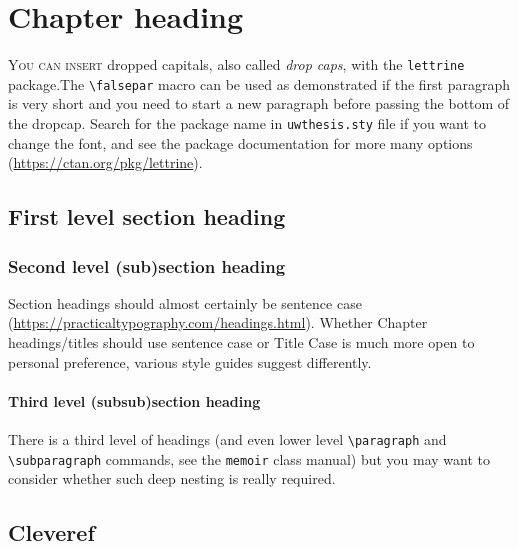 \chapter{Chapter heading}
\label{chap:one}

\lettrine{Y}{ou can insert}
dropped capitals, also called \emph{drop caps}, with the \texttt{lettrine} package.\falsepar The \verb|\falsepar| macro can be used as demonstrated if the first paragraph is very short and you need to start a new paragraph before passing the bottom of the dropcap. Search for the package name in \texttt{uwthesis.sty} file if you want to change the font, and see the package documentation for more many options (\url{https://ctan.org/pkg/lettrine}).



\section{First level section heading}
\label{sec:one}

\subsection{Second level (sub)section heading}
\label{sec:two}

Section headings should almost certainly be sentence case (\url{https://practicaltypography.com/headings.html}). Whether Chapter headings/titles should use sentence case or Title Case is much more open to personal preference, various style guides suggest differently.


\subsubsection{Third level (subsub)section heading}
\label{sec:three}

There is a third level of headings (and even lower level \verb|\paragraph| and \verb|\subparagraph| commands, see the \texttt{memoir} class manual) but you may want to consider whether such deep nesting is really required.


\section{Cleveref}
\label{sec:cleveref}

